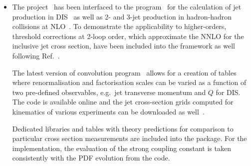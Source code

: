 \begin{itemize}
  \item The \fastnlo project~\cite{Kluge:2006xs} has been interfaced
    to the \nlojetpp program~\cite{Nagy:1998bb} for the calculation of
    jet production in DIS~\cite{Nagy:2001xb} as well as 2- and 3-jet
    production in hadron-hadron collisions at
    NLO~\cite{Nagy:2003tz,Nagy:2001fj}. To demonstrate the
    applicability to higher-orders, threshold corrections at 2-loop
    order, which approximate the NNLO for the inclusive jet cross
    section, have been included into the framework as
    well~\cite{Wobisch:2011ij} following Ref.~\cite{Kidonakis:2000gi}.

    The latest version of \fastnlo convolution program~\cite{Britzger:2012bs} allows for a
    creation of tables where renormalisation and factorisation scales
    can be varied as a function of two pre-defined observables, e.g.\ jet
    transverse momentum \pperp and $Q$ for DIS\@. 
    The \fastnlo code is available online and the
    jet cross-section grids computed for kinematics of various experiments
    can be downloaded as well~\cite{fastNLO:HepForge}.

    Dedicated \fastnlo libraries and tables with theory predictions  for comparison to
    particular cross section measurements are included into the \fitter package. 
    For the \fitter implementation, the evaluation of the strong coupling constant is taken
    consistently with the PDF evolution from the \qcdnum code. 
%
%


\end{itemize}
